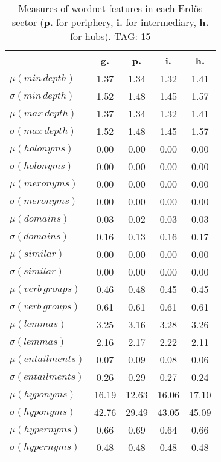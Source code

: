 \begin{table}[h!]
\begin{center}
\begin{tabular}{| l | c | c | c | c |}\hline
 & g. & p. & i. & h. \\\hline
$\mu(min\,depth)$ & 1.37  & 1.34  & 1.32  & 1.41 \\\hline
$\sigma(min\,depth)$ & 1.52  & 1.48  & 1.45  & 1.57 \\\hline
$\mu(max\,depth)$ & 1.37  & 1.34  & 1.32  & 1.41 \\\hline
$\sigma(max\,depth)$ & 1.52  & 1.48  & 1.45  & 1.57 \\\hline
$\mu(holonyms)$ & 0.00  & 0.00  & 0.00  & 0.00 \\\hline
$\sigma(holonyms)$ & 0.00  & 0.00  & 0.00  & 0.00 \\\hline
$\mu(meronyms)$ & 0.00  & 0.00  & 0.00  & 0.00 \\\hline
$\sigma(meronyms)$ & 0.00  & 0.00  & 0.00  & 0.00 \\\hline
$\mu(domains)$ & 0.03  & 0.02  & 0.03  & 0.03 \\\hline
$\sigma(domains)$ & 0.16  & 0.13  & 0.16  & 0.17 \\\hline
$\mu(similar)$ & 0.00  & 0.00  & 0.00  & 0.00 \\\hline
$\sigma(similar)$ & 0.00  & 0.00  & 0.00  & 0.00 \\\hline
$\mu(verb\,groups)$ & 0.46  & 0.48  & 0.45  & 0.45 \\\hline
$\sigma(verb\,groups)$ & 0.61  & 0.61  & 0.61  & 0.61 \\\hline
$\mu(lemmas)$ & 3.25  & 3.16  & 3.28  & 3.26 \\\hline
$\sigma(lemmas)$ & 2.16  & 2.17  & 2.22  & 2.11 \\\hline
$\mu(entailments)$ & 0.07  & 0.09  & 0.08  & 0.06 \\\hline
$\sigma(entailments)$ & 0.26  & 0.29  & 0.27  & 0.24 \\\hline
$\mu(hyponyms)$ & 16.19  & 12.63  & 16.06  & 17.10 \\\hline
$\sigma(hyponyms)$ & 42.76  & 29.49  & 43.05  & 45.09 \\\hline
$\mu(hypernyms)$ & 0.66  & 0.69  & 0.64  & 0.66 \\\hline
$\sigma(hypernyms)$ & 0.48  & 0.48  & 0.48  & 0.48 \\\hline
\end{tabular}
\caption{Measures of wordnet features in each Erd\"os sector ({{\bf p.}} for periphery, {{\bf i.}} for intermediary, {{\bf h.}} for hubs). TAG: 15}
\end{center}
\end{table}